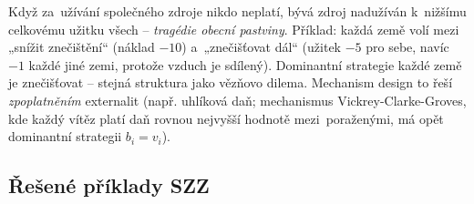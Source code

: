 \begin{poznamka}
Když za~užívání společného zdroje nikdo neplatí, bývá zdroj nadužíván k~nižšímu celkovému užitku všech -- \emph{tragédie obecní pastviny}. Příklad: každá země volí mezi „snížit znečištění`` (náklad $-10$) a~„znečišťovat dál`` (užitek $-5$ pro sebe, navíc $-1$ každé jiné zemi, protože vzduch je sdílený). Dominantní strategie každé země je znečišťovat -- stejná struktura jako vězňovo dilema. Mechanism design to řeší \emph{zpoplatněním} externalit (např. uhlíková daň; mechanismus Vickrey-Clarke-Groves, kde každý vítěz platí daň rovnou nejvyšší hodnotě mezi~poraženými, má opět dominantní strategii $b_i=v_i$).
\end{poznamka}

\subsection{Řešené příklady SZZ}

